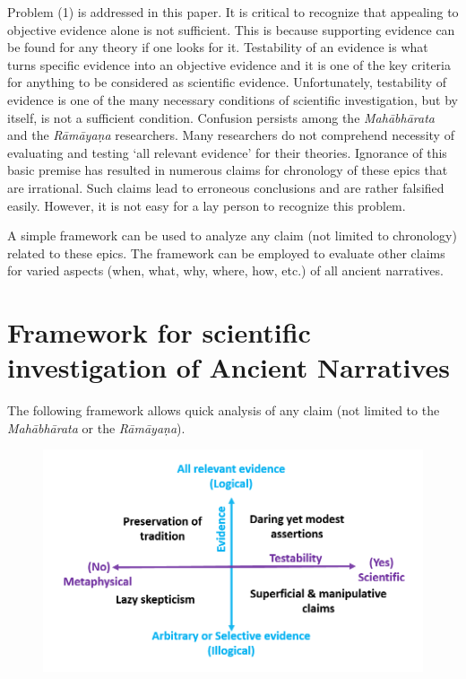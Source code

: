 Problem (1) is addressed in this paper. It is critical to recognize that appealing to objective evidence alone is not sufficient. This is because supporting evidence can be found for any theory if one looks for it. Testability of an evidence is what turns specific evidence into an objective evidence and it is one of the key criteria for anything to be considered as scientific evidence. Unfortunately, testability of evidence is one of the many necessary conditions of scientific investigation, but by itself, is not a sufficient condition. Confusion persists among the \textit{Mahābhārata} and the \textit{Rāmāyaṇa} researchers. Many researchers do not comprehend necessity of evaluating and testing ‘all relevant evidence’ for their theories. Ignorance of this basic premise has resulted in numerous claims for chronology of these epics that are irrational. Such claims lead to erroneous conclusions and are rather falsified easily. However, it is not easy for a lay person to recognize this problem.

A simple framework can be used to analyze any claim (not limited to chronology) related to these epics. The framework can be employed to evaluate other claims for varied aspects (when, what, why, where, how, etc.) of all ancient narratives.


\section*{Framework for scientific investigation of Ancient Narratives}

The following framework allows quick analysis of any claim (not limited to the \textit{Mahābhārata} or the \textit{Rāmāyaṇa}).

\begin{figure}[!h]
\includegraphics[scale=.3]{images/chap2-2.jpg}
\end{figure}

